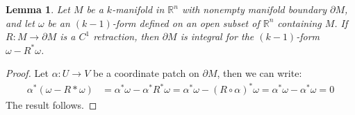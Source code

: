 \documentclass[11pt,oneside]{book}
\theoremstyle{break}
\theoremstyle{break}
\newtheorem{lem}{Lemma}[thm]
\newcommand{\R}{\mathbb{R}}
\begin{document}
\begin{lem}
Let $M$ be a $k$-manifold in $\R^n$ with nonempty manifold boundary $\partial M$, and let $\omega$ be an $(k-1)$-form defined on an open subset of $\R^n$ containing $M$. If $R:M \to \partial M$ is a $C^1$ retraction, then $\partial M$ is integral for the $(k-1)$-form $\omega - R^*\omega$. 
\end{lem}
\begin{proof}
Let $\alpha:U \to V$ be a coordinate patch on $\partial M$, then we can write:
\begin{align*}
\alpha^*(\omega - R*\omega) &= \alpha^*\omega  - \alpha^*R^*\omega= \alpha^*\omega - (R\circ \alpha)^*\omega= \alpha^*\omega - \alpha^*\omega=0
\end{align*} 
The result follows.
\end{proof}
\end{document}
